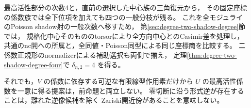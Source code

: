 \begin{remark}[全モジュライの次数へ移すための比較]
最高活性部分の次数4と，直前の選択した中心族の三角復元から，
その固定座標の係数族では全下位項を加えても四つの一般分枝が残る。
これを全モジュライのPoisson shadow射の一般次数へ移すため，
第\ref{sec:degree-two-shadow-degree}節では，
規格化中心そのもののtorsorにより全方向中心とのCasimir差を処理し，
共通のnc開への所属と，全同値・Poisson同型による同じ座標商を比較する。
二係数正規形のnormalizerによる補助選択も両側で揃え，
定理\ref{thm:degree-two-shadow-degree-four}で $\delta_{n,2}=4$ を得る。

それでも，$V$ の係数に依存する可逆な有限線型作用素だけから
$U$ の最高活性係数を一意に得る提案は，前命題と両立しない。
零切断に沿う形式逆が存在することは，離れた逆像候補を除く
Zariski開近傍があることを意味しない。
\end{remark}
